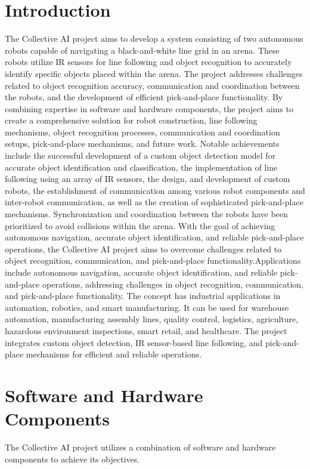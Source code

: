 \documentclass[a4paper,12pt,oneside]{book}
\begin{document}
\section{Introduction}
The Collective AI project aims to develop a system consisting of two autonomous robots capable of navigating a black-and-white line grid in an arena. These robots utilize IR sensors for line following and object recognition to accurately identify specific objects placed within the arena. The project addresses challenges related to object recognition accuracy, communication and coordination between the robots, and the development of efficient pick-and-place functionality. By combining expertise in software and hardware components, the project aims to create a comprehensive solution for robot construction, line following mechanisms, object recognition processes, communication and coordination setups, pick-and-place mechanisms, and future work. Notable achievements include the successful development of a custom object detection model for accurate object identification and classification, the implementation of line following using an array of IR sensors, the design, and development of custom robots, the establishment of communication among various robot components and inter-robot communication, as well as the creation of sophisticated pick-and-place mechanisms. Synchronization and coordination between the robots have been prioritized to avoid collisions within the arena. With the goal of achieving autonomous navigation, accurate object identification, and reliable pick-and-place operations, the Collective AI project aims to overcome challenges related to object recognition, communication, and pick-and-place functionality.Applications include autonomous navigation, accurate object identification, and reliable pick-and-place operations, addressing challenges in object recognition, communication, and pick-and-place functionality.
The concept has industrial applications in automation, robotics, and smart manufacturing. It can be used for warehouse automation, manufacturing assembly lines, quality control, logistics, agriculture, hazardous environment inspections, smart retail, and healthcare. The project integrates custom object detection, IR sensor-based line following, and pick-and-place mechanisms for efficient and reliable operations.
\newpage
\section{Software and Hardware Components}
The Collective AI project utilizes a combination of software and hardware components to achieve its objectives.
\end{document}
